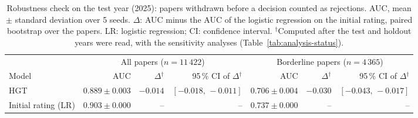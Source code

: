 \begin{table}[t]
\centering
\small
\setlength{\tabcolsep}{4pt}
\caption{Robustness check on the test year (2025): papers withdrawn before a decision counted as rejections. AUC, mean $\pm$ standard deviation over 5 seeds. $\Delta$: AUC minus the AUC of the logistic regression on the initial rating, paired bootstrap over the papers. LR: logistic regression; CI: confidence interval. $^{\dagger}$Computed after the test and holdout years were read, with the sensitivity analyses (Table~\ref{tab:analysis-status}).}
\label{tab:robustness-withdrawn}
\begin{tabular}{@{}lrrrrrr@{}}
\toprule
 & \multicolumn{3}{c}{All papers ($n = 11\,422$)} & \multicolumn{3}{c}{Borderline papers ($n = 4\,365$)} \\
\cmidrule(lr){2-4} \cmidrule(lr){5-7}
Model & AUC & $\Delta$$^{\dagger}$ & 95\,\% CI of $\Delta$$^{\dagger}$ & AUC & $\Delta$$^{\dagger}$ & 95\,\% CI of $\Delta$$^{\dagger}$ \\
\midrule
HGT & $0.889 \pm 0.003$ & $-0.014$ & $[-0.018,\,-0.011]$ & $0.706 \pm 0.004$ & $-0.030$ & $[-0.043,\,-0.017]$ \\
Initial rating (LR) & $0.903 \pm 0.000$ & -- & -- & $0.737 \pm 0.000$ & -- & -- \\
\bottomrule
\end{tabular}
\end{table}

